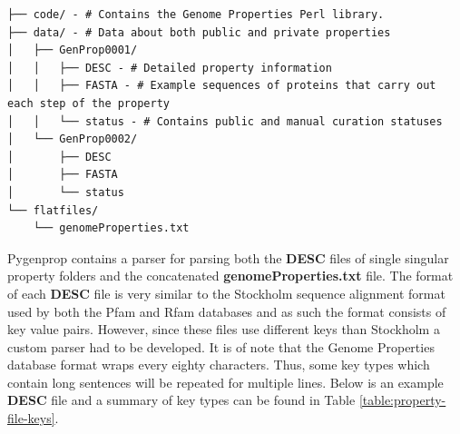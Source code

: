 \begin{verbatim}
├── code/ - # Contains the Genome Properties Perl library.
├── data/ - # Data about both public and private properties
│   ├── GenProp0001/
│   │   ├── DESC - # Detailed property information
│   │   ├── FASTA - # Example sequences of proteins that carry out each step of the property
│   │   └── status - # Contains public and manual curation statuses
│   └── GenProp0002/
│       ├── DESC
│       ├── FASTA
│       └── status
└── flatfiles/
    └── genomeProperties.txt
\end{verbatim}

Pygenprop contains a parser for parsing both the \textbf{DESC} files of single singular property folders and the concatenated \textbf{genomeProperties.txt} file. The format of each \textbf{DESC} file is very similar to the Stockholm sequence alignment format used by both the Pfam and Rfam databases \cite{bateman2004pfam, griffiths2003rfam} and as such the format consists of key value pairs. However, since these files use different keys than Stockholm a custom parser had to be developed. It is of note that the Genome Properties database format wraps every eighty characters. Thus, some key types which contain long sentences will be repeated for multiple lines.  Below is an example \textbf{DESC} file and a summary of key types can be found in Table \ref{table:property-file-keys}.

